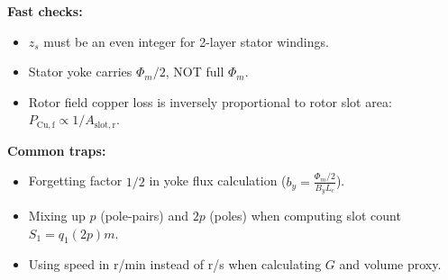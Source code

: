 \textbf{Fast checks:}
\begin{itemize}
  \item $z_s$ must be an even integer for 2-layer stator windings.
  \item Stator yoke carries $\Phi_m/2$, NOT full $\Phi_m$.
  \item Rotor field copper loss is inversely proportional to rotor slot area: $P_{\mathrm{Cu,f}} \propto 1/A_{\mathrm{slot,r}}$.
\end{itemize}

\textbf{Common traps:}
\begin{itemize}
  \item Forgetting factor $1/2$ in yoke flux calculation ($b_y = \frac{\Phi_m/2}{B_y L_c}$).
  \item Mixing up $p$ (pole-pairs) and $2p$ (poles) when computing slot count $S_1 = q_1 (2p) m$.
  \item Using speed in r/min instead of r/s when calculating $G$ and volume proxy.
\end{itemize}

